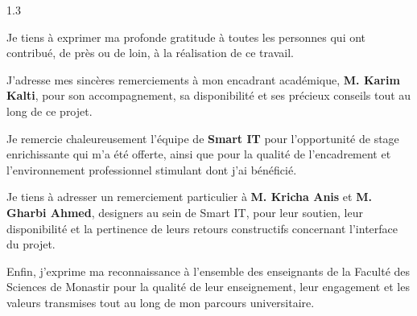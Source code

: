 \thispagestyle{empty}


\vspace*{0.5cm}

\noindent
{}


\vspace{1.2cm}

\begin{justify}
\begin{spacing}{1.3}

\fontsize{13pt}{21pt}\selectfont

Je tiens à exprimer ma profonde gratitude à toutes les personnes qui ont contribué, de près ou de loin, à la réalisation de ce travail.

\vspace{0.6cm}

J’adresse mes sincères remerciements à mon encadrant académique, \textbf{M. Karim Kalti}, pour son accompagnement, sa disponibilité et ses précieux conseils tout au long de ce projet.

\vspace{0.6cm}

Je remercie chaleureusement l’équipe de \textbf{Smart IT} pour l’opportunité de stage enrichissante qui m’a été offerte, ainsi que pour la qualité de l’encadrement et l’environnement professionnel stimulant dont j’ai bénéficié.

\vspace{0.6cm}

Je tiens à adresser un remerciement particulier à \textbf{M. Kricha Anis} et \textbf{M. Gharbi Ahmed}, designers au sein de Smart IT, pour leur soutien, leur disponibilité et la pertinence de leurs retours constructifs concernant l’interface du projet.

\vspace{0.6cm}

Enfin, j’exprime ma reconnaissance à l’ensemble des enseignants de la Faculté des Sciences de Monastir pour la qualité de leur enseignement, leur engagement et les valeurs transmises tout au long de mon parcours universitaire.

\end{spacing}
\end{justify}